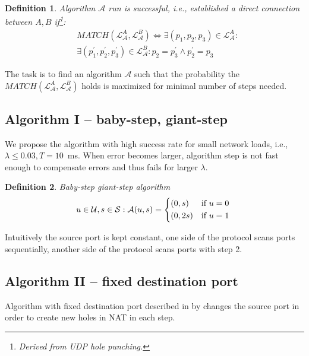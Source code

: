 \documentclass{llncs}
\newtheorem{mydef}{Definition}
\begin{document}
\begin{mydef}
\label{def:match}
Algorithm $\mathcal{A}$ run is successful, i.e., established a direct connection between $A,B$ if\footnote{Derived from UDP hole punching.}:
\begin{align*}
& MATCH(\mathcal{L}^{A}_{\mathcal{A}}, \mathcal{L}^{B}_{\mathcal{A}}) \Leftrightarrow \exists(p_1, p_2, p_3) \in \mathcal{L}^{A}_{\mathcal{A}}: \\
& \exists(p_1^{\prime}, p_2^{\prime}, p_3^{\prime}) \in \mathcal{L}^{B}_{\mathcal{A}}: p_2 = p_3^{\prime} \wedge p_2^{\prime} = p_3
%
\end{align*}
\end{mydef}
The task is to find an algorithm $\mathcal{A}$ such that the probability the $MATCH(\mathcal{L}^{A}_{\mathcal{A}}, \mathcal{L}^{B}_{\mathcal{A}})$
holds is maximized for minimal number of steps needed.

\subsection{Algorithm I -- baby-step, giant-step}
We propose the algorithm with high success rate for small network loads, i.e.,
$\lambda \leq 0.03, T=10$~ms. When error becomes larger,
algorithm step is not fast enough to compensate errors and thus fails for larger $\lambda$.

\begin{mydef}
Baby-step giant-step algorithm
\[
u \in \mathcal{U}, s \in \mathcal{S}: 
\mathcal{A}(u, s) = \begin{dcases*}
         (0, s)  & \text{if} $u=0$\\
         (0, 2s) & \text{if} $u=1$
        \end{dcases*}
\]
\end{mydef}

Intuitively the source port is kept constant, one side of the protocol scans ports sequentially, another
side of the protocol scans ports with step 2.

\subsection{Algorithm II -- fixed destination port}
Algorithm with fixed destination port described in by \citep{Wang:2006:RSN:1156422.1156550}
changes the source port in order to create new holes in NAT in each step.
\end{document}
